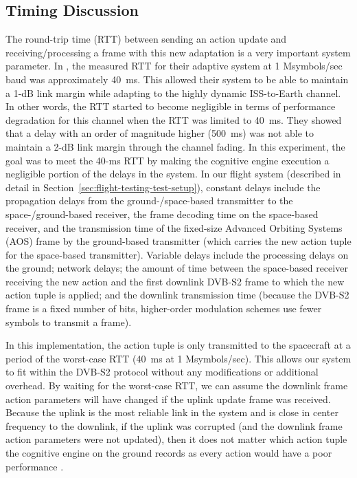 \documentclass[journal]{IEEEtran}
\begin{document}
\subsection{Timing Discussion}
The round-trip time (RTT) between sending an action update and receiving/processing a frame with this new adaptation is a very important system parameter.  In \cite{downey-paper}, the measured RTT for their adaptive system at 1 Msymbols/sec baud was approximately 40~ms.  This allowed their system to be able to maintain a 1-dB link margin while adapting to the highly dynamic ISS-to-Earth channel.  In other words, the RTT started to become negligible in terms of performance degradation for this channel when the RTT was limited to 40~ms.  They showed that a delay with an order of magnitude higher (500~ms) was not able to maintain a 2-dB link margin through the channel fading.  In this experiment, the goal was to meet the 40-ms RTT by making the cognitive engine execution a negligible portion of the delays in the system.  In our flight system (described in detail in Section~\ref{sec:flight-testing-test-setup}), constant delays include the propagation delays from the ground-/space-based transmitter to the space-/ground-based receiver, the frame decoding time on the space-based receiver, and the transmission time of the fixed-size Advanced Orbiting Systems (AOS) frame by the ground-based transmitter (which carries the new action tuple for the space-based transmitter).  Variable delays include the processing delays on the ground; network delays; the amount of time between the space-based receiver receiving the new action and the first downlink DVB-S2 frame to which the new action tuple is applied; and the downlink transmission time (because the DVB-S2 frame is a fixed number of bits, higher-order modulation schemes use fewer symbols to transmit a frame).

In this implementation, the action tuple is only transmitted to the spacecraft at a period of the worst-case RTT (40~ms at 1 Msymbols/sec).  This allows our system to fit within the DVB-S2 protocol without any modifications or additional overhead.  By waiting for the worst-case RTT, we can assume the downlink frame action parameters will have changed if the uplink update frame was received.  Because the uplink is the most reliable link in the system and is close in center frequency to the downlink, if the uplink was corrupted (and the downlink frame action parameters were not updated), then it does not matter which action tuple the cognitive engine on the ground records as every action would have a poor performance \cite{tim-ccaa}.
\end{document}
